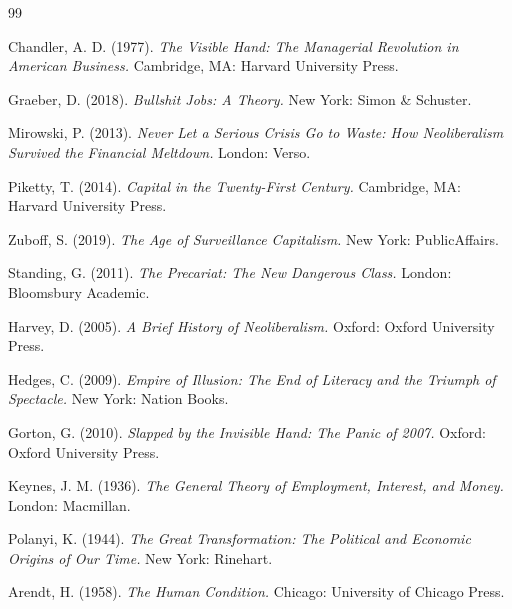 \documentclass[11pt,twoside]{book}
\begin{document}
\begin{thebibliography}{99}

Chandler, A. D. (1977). \textit{The Visible Hand: The Managerial Revolution in American Business.} Cambridge, MA: Harvard University Press.

Graeber, D. (2018). \textit{Bullshit Jobs: A Theory.} New York: Simon \& Schuster.

Mirowski, P. (2013). \textit{Never Let a Serious Crisis Go to Waste: How Neoliberalism Survived the Financial Meltdown.} London: Verso.

Piketty, T. (2014). \textit{Capital in the Twenty-First Century.} Cambridge, MA: Harvard University Press.

Zuboff, S. (2019). \textit{The Age of Surveillance Capitalism.} New York: PublicAffairs.

Standing, G. (2011). \textit{The Precariat: The New Dangerous Class.} London: Bloomsbury Academic.

Harvey, D. (2005). \textit{A Brief History of Neoliberalism.} Oxford: Oxford University Press.

Hedges, C. (2009). \textit{Empire of Illusion: The End of Literacy and the Triumph of Spectacle.} New York: Nation Books.

Gorton, G. (2010). \textit{Slapped by the Invisible Hand: The Panic of 2007.} Oxford: Oxford University Press.

Keynes, J. M. (1936). \textit{The General Theory of Employment, Interest, and Money.} London: Macmillan.

Polanyi, K. (1944). \textit{The Great Transformation: The Political and Economic Origins of Our Time.} New York: Rinehart.

Arendt, H. (1958). \textit{The Human Condition.} Chicago: University of Chicago Press.

\end{thebibliography}

%
\end{document}
